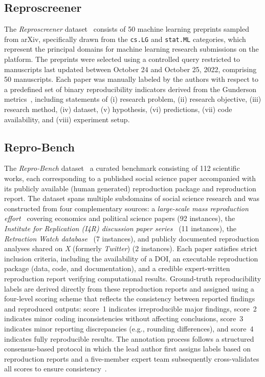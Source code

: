 \documentclass{article}
\begin{document}
\subsection{Reproscreener}

The \textit{Reproscreener} dataset~\citep{bhaskar2024reproscreener} consists of 50 machine learning preprints sampled from arXiv, specifically drawn from the \texttt{cs.LG} and \texttt{stat.ML} categories, which represent the principal domains for machine learning research submissions on the platform. 
The preprints were selected using a controlled query restricted to manuscripts last updated between October 24 and October 25, 2022, comprising 50 manuscripts. 
Each paper was manually labeled by the authors with respect to a predefined set of binary reproducibility indicators derived from the Gunderson metrics~\citep{gundersen2018state}, including statements of (i) research problem, (ii) research objective, (iii) research method, (iv) dataset, (v) hypothesis, (vi) predictions, (vii) code availability, and (viii) experiment setup.

\subsection{Repro-Bench}

The \textit{Repro-Bench} dataset~\citep{hu2025repro} a curated benchmark consisting of 112 scientific works, each corresponding to a published social science paper accompanied with its publicly available (human generated) reproduction package and reproduction report. 
The dataset spans multiple subdomains of social science research and was constructed from four complementary sources: a \textit{large-scale mass reproduction effort}~\citep{brodeur2024mass} covering economics and political science papers (92 instances), the \textit{Institute for Replication (I4R) discussion paper series}~\citep{i4r} (11 instances), the\textit{ Retraction Watch database}~\citep{retrdb} (7 instances), and publicly documented reproduction analyses shared on \textit{X} (formerly \textit{Twitter}) (2 instances). 
Each paper satisfies strict inclusion criteria, including the availability of a DOI, an executable reproduction package (data, code, and documentation), and a credible expert-written reproduction report verifying computational results. 
Ground-truth reproducibility labels are derived directly from these reproduction reports and assigned using a four-level scoring scheme that reflects the consistency between reported findings and reproduced outputs: score~1 indicates irreproducible major findings, score~2 indicates minor coding inconsistencies without affecting conclusions, score~3 indicates minor reporting discrepancies (e.g., rounding differences), and score~4 indicates fully reproducible results. 
The annotation process follows a structured consensus-based protocol in which the lead author first assigns labels based on reproduction reports and a five-member expert team subsequently cross-validates all scores to ensure consistency~\citep{hu2025repro}. 
\end{document}
